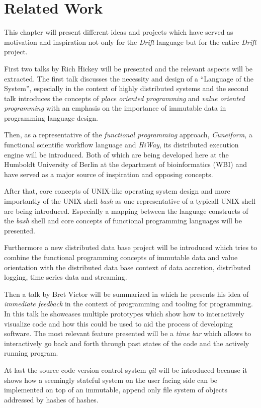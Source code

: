 \section{Related Work}
\label{RelatedWork}

This chapter will present different ideas and projects which have
served as motivation and inspiration not only for the \textit{Drift} language
but for the entire \textit{Drift} project.

First two talks by Rich Hickey will be presented and the relevant
aspects will be extracted. The first talk discusses the necessity
and design of a ``Language of the System'', especially in the
context of highly distributed systems and the second talk
introduces the concepts of \textit{place oriented programming}
and \textit{value oriented programming} with an emphasis on
the importance of immutable data in programming language design.

Then, as a representative of the \textit{functional programming}
approach, \textit{Cuneiform}, a functional scientific workflow language
and \textit{HiWay}, its distributed execution engine
will be introduced. Both of which are being developed here at the
Humboldt University of Berlin at the department of bioinformatics (WBI)
and have served as a major source of inspiration and opposing
concepts.

After that, core concepts of UNIX-like operating system design
and more importantly of the UNIX shell \textit{bash} as one representative
of a typicall UNIX shell are being introduced. Especially a
mapping between the language constructs of the \textit{bash} shell
and core concepts of functional programming languages will be
presented.

Furthermore a new distributed data base project will be introduced
which tries to combine the functional programming concepts of
immutable data and value orientation with the distributed data base
context of data accretion, distributed logging, time series data
and streaming.

Then a talk by Bret Victor will be summarized in which he presents
his idea of \textit{immediate feedback} in the context of programming
and tooling for programming. In this talk he showcases multiple
prototypes which show how to interactively visualize code and how
this could be used to aid the process of developing software.
The most relevant feature presented will be a \textit{time bar}
which allows to interactively go back and forth through past
states of the code and the actively running program.

At last the source code version control system \textit{git} will
be introduced because it shows how a seemingly stateful system
on the user facing side can be implemented on top of an immutable,
append only file system of objects addressed by hashes of hashes.

